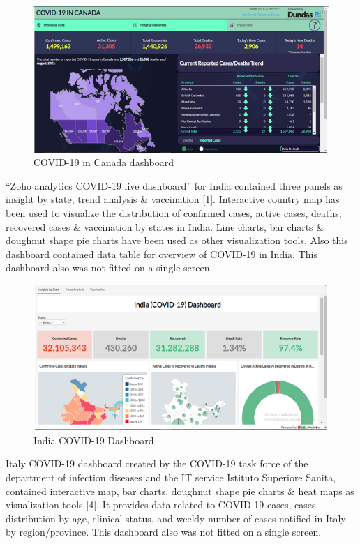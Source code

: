 \documentclass[
]{article}
\begin{document}
\begin{figure}
\includegraphics[width=8.47in]{Images/8} \caption{COVID-19 in Canada dashboard}\label{fig:unnamed-chunk-8}
\end{figure}

``Zoho analytics COVID-19 live dashboard'' for India contained three
panels as insight by state, trend analysis \& vaccination {[}1{]}.
Interactive country map has been used to visualize the distribution of
confirmed cases, active cases, deaths, recovered cases \& vaccination by
states in India. Line charts, bar charts \& doughnut shape pie charts
have been used as other visualization tools. Also this dashboard
contained data table for overview of COVID-19 in India. This dashboard
also was not fitted on a single screen.

\begin{figure}
\includegraphics[width=8.42in]{Images/9} \caption{India COVID-19 Dashboard}\label{fig:unnamed-chunk-9}
\end{figure}

Italy COVID-19 dashboard created by the COVID-19 task force of the
department of infection diseases and the IT service Istituto Superiore
Sanita, contained interactive map, bar charts, doughnut shape pie charts
\& heat maps as visualization tools {[}4{]}. It provides data related to
COVID-19 cases, cases distribution by age, clinical status, and weekly
number of cases notified in Italy by region/province. This dashboard
also was not fitted on a single screen.
\end{document}
